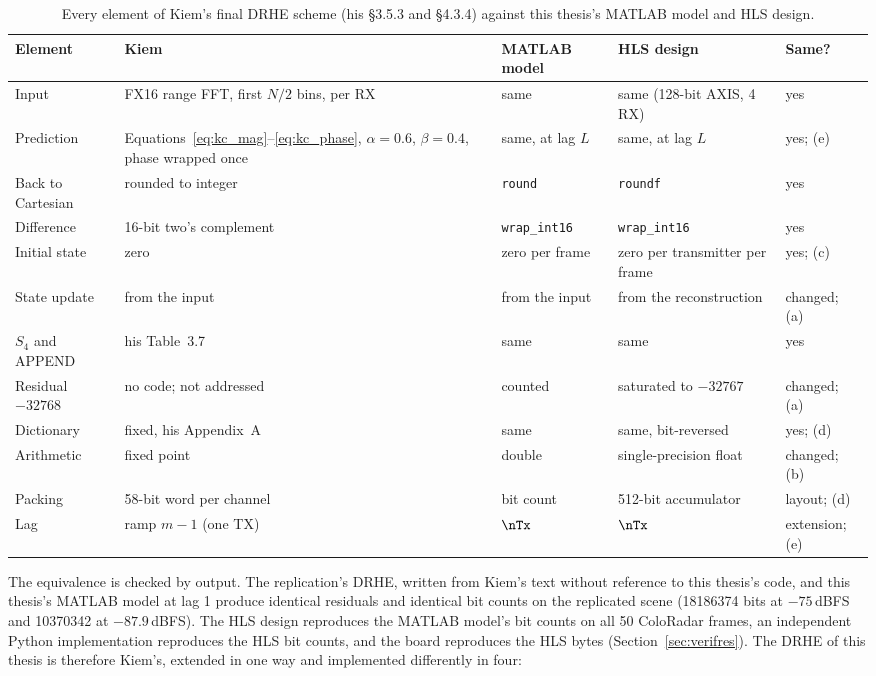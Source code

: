 \begin{table}[htbp]
\centering
\caption[DRHE audit against Kiem's specification]{Every element of Kiem's
final DRHE scheme (his \S{}3.5.3 and \S{}4.3.4) against this thesis's MATLAB
model and HLS design.}
\label{tab:kc_audit}
\scriptsize
\renewcommand{\arraystretch}{1.2}
\setlength{\tabcolsep}{3pt}
\begin{tabular}{@{}>{\raggedright}p{}>{\raggedright}p{}>{\raggedright}p{}>{\raggedright}p{}>{\raggedright\arraybackslash}p{}@{}}
\toprule
Element & Kiem & MATLAB model & HLS design & Same?\\
\midrule
Input & FX16 range FFT, first $N/2$ bins, per RX & same & same (128-bit AXIS, 4 RX) & yes\\
Prediction & Equations~\eqref{eq:kc_mag}--\eqref{eq:kc_phase}, $\alpha = 0.6$, $\beta = 0.4$, phase wrapped once & same, at lag $L$ & same, at lag $L$ & yes; (e)\\
Back to Cartesian & rounded to integer & \texttt{round} & \texttt{roundf} & yes\\
Difference & 16-bit two's complement & \texttt{wrap\_int16} & \texttt{wrap\_int16} & yes\\
Initial state & zero & zero per frame & zero per transmitter per frame & yes; (c)\\
State update & from the input & from the input & from the reconstruction & changed; (a)\\
$S_4$ and APPEND & his Table~3.7 & same & same & yes\\
Residual $-32768$ & no code; not addressed & counted & saturated to $-32767$ & changed; (a)\\
Dictionary & fixed, his Appendix~A & same & same, bit-reversed & yes; (d)\\
Arithmetic & fixed point & double & single-precision float & changed; (b)\\
Packing & 58-bit word per channel & bit count & 512-bit accumulator & layout; (d)\\
Lag & ramp $m-1$ (one TX) & $\nTx$ & $\nTx$ & extension; (e)\\
\bottomrule
\end{tabular}
\end{table}

The equivalence is checked by output. The replication's DRHE, written from
Kiem's text without reference to this thesis's code, and this thesis's MATLAB
model at lag 1 produce identical residuals and identical bit counts on the
replicated scene (\num{18186374} bits at $-75$\,dBFS and \num{10370342} at
$-87.9$\,dBFS). The HLS design reproduces the MATLAB model's bit counts on all
50 ColoRadar frames, an independent Python implementation reproduces the HLS
bit counts, and the board reproduces the HLS bytes
(Section~\ref{sec:verifres}). The DRHE of this thesis is therefore Kiem's,
extended in one way and implemented differently in four:

